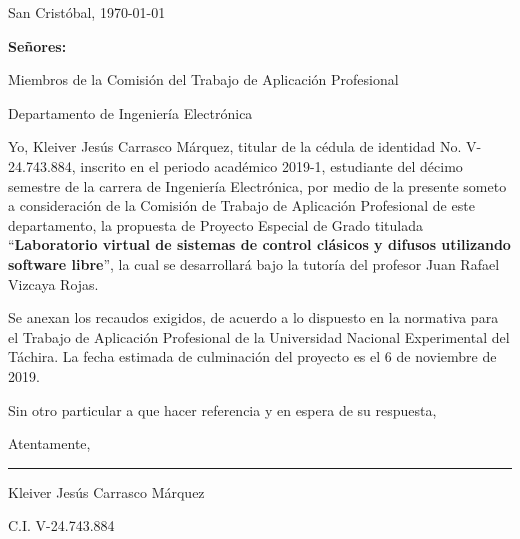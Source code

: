 \begin{titlepage}
\setcounter{page}{2}
\setlength{\parindent}{1.5cm}					%
\setlength{\parskip}{0pt}						%

\begin{flushright}
	San Cristóbal, \today
\end{flushright}

\vspace{1cm}
\vfill

\begin{flushleft}
		\singlespacing
		\setlength{\parskip}{0pt}
		
		\textbf{Señores:}
		
		Miembros de la Comisión del Trabajo de Aplicación Profesional
		
		Departamento de Ingeniería Electrónica
		
\end{flushleft}

\vfill
\begin{spacing}{1.5}
	Yo, Kleiver Jesús Carrasco Márquez, titular de la cédula de identidad No. \mbox{V-24.743.884}, inscrito en el periodo académico 2019-1, estudiante del décimo semestre de la carrera de Ingeniería Electrónica, por medio de la presente someto a consideración de la Comisión de Trabajo de Aplicación Profesional de este departamento, la propuesta de Proyecto Especial de Grado titulada \enquote{\textbf{Laboratorio virtual de sistemas de control clásicos y difusos utilizando software libre}}, la cual se desarrollará bajo la tutoría del profesor Juan Rafael Vizcaya Rojas.
	
	Se anexan los recaudos exigidos, de acuerdo a lo dispuesto en la normativa para el Trabajo de Aplicación Profesional de la Universidad Nacional Experimental del Táchira. La fecha estimada de culminación del proyecto es el 6 de noviembre de 2019.
	
	Sin otro particular a que hacer referencia y en espera de su respuesta,
	
	\setlength{\parskip}{20pt} 
	
	\noindent Atentamente,
\end{spacing}

\vfill

\begin{center}
	
	\rule{6cm}{1pt}
	
	\vspace{0.2cm}
	
	Kleiver Jesús Carrasco Márquez
	
	\setlength{\parskip}{0pt}
	
	C.I. V-24.743.884
\end{center}

\vspace{0.5cm}
\end{titlepage}
